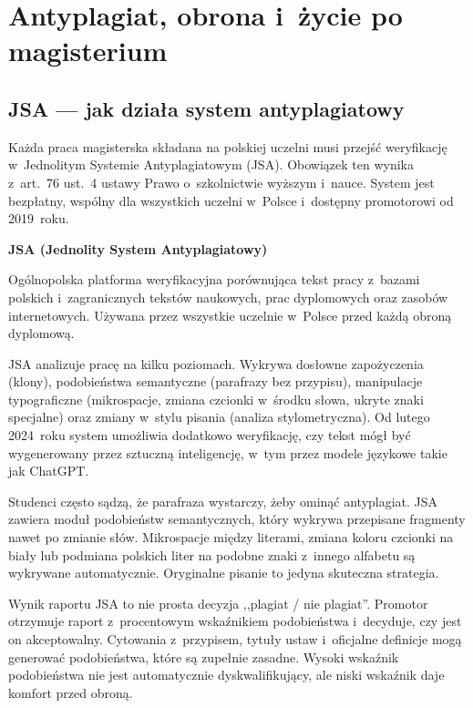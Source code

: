 \documentclass[11pt,a5paper,twoside,openany]{book}
\let\bforigsection\section
\renewcommand{\section}{\needspace{4\baselineskip}\bforigsection}
\newcommand{\concept}[2]{%
  \par\vspace{6pt}
  \begin{tcolorbox}[enhanced, breakable, colback=accent!6, colframe=accent,
    boxrule=0pt, leftrule=3.5pt, arc=2pt, drop fuzzy shadow={black!15},
    left=10pt, right=10pt, top=7pt, bottom=7pt, before upper={\parindent0pt}]
    {\sffamily\bfseries\color{accent}#1}\par\vspace{2pt}\small #2
  \end{tcolorbox}\par
}
\begin{document}
\clearpage

\chapter{Antyplagiat, obrona i~życie po magisterium}

\section{JSA --- jak działa system antyplagiatowy}

Każda praca magisterska składana na polskiej uczelni musi przejść weryfikację w~Jednolitym Systemie Antyplagiatowym (JSA). Obowiązek ten wynika z~art.~76 ust.~4 ustawy Prawo o~szkolnictwie wyższym i~nauce. System jest bezpłatny, wspólny dla wszystkich uczelni w~Polsce i~dostępny promotorowi od 2019~roku.

\concept{JSA (Jednolity System Antyplagiatowy)}{Ogólnopolska platforma weryfikacyjna porównująca tekst pracy z~bazami polskich i~zagranicznych tekstów naukowych, prac dyplomowych oraz zasobów internetowych. Używana przez wszystkie uczelnie w~Polsce przed każdą obroną dyplomową.}

JSA analizuje pracę na kilku poziomach. Wykrywa dosłowne zapożyczenia (klony), podobieństwa semantyczne (parafrazy bez przypisu), manipulacje typograficzne (mikrospacje, zmiana czcionki w~środku słowa, ukryte znaki specjalne) oraz zmiany w~stylu pisania (analiza stylometryczna). Od lutego 2024~roku system umożliwia dodatkowo weryfikację, czy tekst mógł być wygenerowany przez sztuczną inteligencję, w~tym przez modele językowe takie jak ChatGPT.

\begin{warningbox}
Studenci często sądzą, że parafraza wystarczy, żeby ominąć antyplagiat. JSA zawiera moduł podobieństw semantycznych, który wykrywa przepisane fragmenty nawet po zmianie słów. Mikrospacje między literami, zmiana koloru czcionki na biały lub podmiana polskich liter na podobne znaki z~innego alfabetu są wykrywane automatycznie. Oryginalne pisanie to jedyna skuteczna strategia.
\end{warningbox}

Wynik raportu JSA to nie prosta decyzja ,,plagiat / nie plagiat''. Promotor otrzymuje raport z~procentowym wskaźnikiem podobieństwa i~decyduje, czy jest on akceptowalny. Cytowania z~przypisem, tytuły ustaw i~oficjalne definicje mogą generować podobieństwa, które są zupełnie zasadne. Wysoki wskaźnik podobieństwa nie jest automatycznie dyskwalifikujący, ale niski wskaźnik daje komfort przed obroną.
\end{document}
